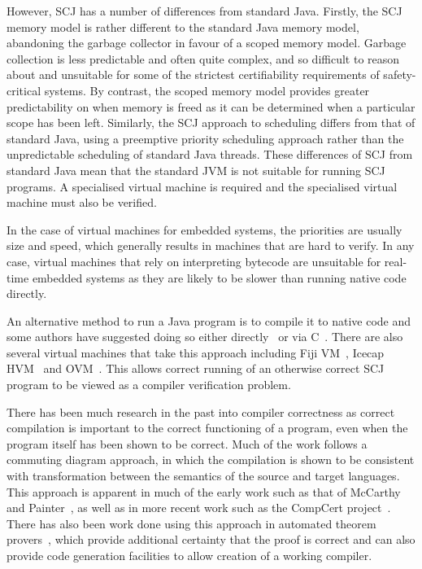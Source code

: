 \documentclass[a4paper,12pt]{article}
\begin{document}
However, SCJ has a number of differences from standard Java. Firstly, the SCJ
memory model is rather different to the standard Java memory model, abandoning
the garbage collector in favour of a scoped memory model.  Garbage collection is
less predictable and often quite complex, and so difficult to reason about and
unsuitable for some of the strictest certifiability requirements of
safety-critical systems.  By contrast, the scoped memory model provides greater
predictability on when memory is freed as it can be determined when a particular
scope has been left.  Similarly, the SCJ approach to scheduling differs from
that of standard Java, using a preemptive priority scheduling approach rather
than the unpredictable scheduling of standard Java threads.  These differences
of SCJ from standard Java mean that the standard JVM is not suitable for running
SCJ programs.  A specialised virtual machine is required and the specialised
virtual machine must also be verified.

In the case of virtual machines for embedded systems, the priorities are usually
size and speed, which generally results in machines that are hard to verify.  In
any case, virtual machines that rely on interpreting bytecode are unsuitable for
real-time embedded systems as they are likely to be slower than running native
code directly.

An alternative method to run a Java program is to compile it to native code and
some authors have suggested doing so either directly~\cite{schultz2003} or via
C~\cite{varma2004}. There are also several virtual machines that take this
approach including Fiji VM~\cite{pizlo2009}, Icecap HVM~\cite{sondergaard2012}
and OVM~\cite{armbruster2007}.  This allows correct running of an otherwise
correct SCJ program to be viewed as a compiler verification problem.

There has been much research in the past into compiler correctness as correct
compilation is important to the correct functioning of a program, even when the
program itself has been shown to be correct.  Much of the work follows a
commuting diagram approach, in which the compilation is shown to be consistent
with transformation between the semantics of the source and target
languages\cite{morris1973, thatcher1979}. This approach is apparent in much of
the early work such as that of McCarthy and Painter~\cite{mccarthy1967}, as well
as in more recent work such as the CompCert project~\cite{leroy2009a,
  leroy2009b}. There has also been work done using this approach in automated
theorem provers~\cite{klein2006, milner1972, nipkow2000}, which provide
additional certainty that the proof is correct and can also provide code
generation facilities to allow creation of a working compiler.
\end{document}
